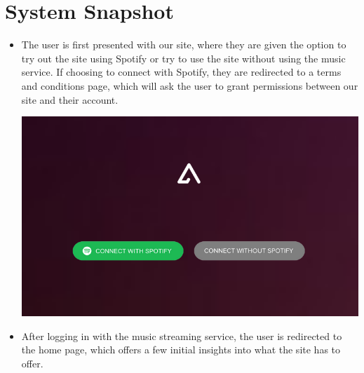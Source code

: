 \documentclass[letter, 11pt]{article}
\begin{document}
\section*{System Snapshot}
\begin{itemize}
    \item The user is first presented with our site, where they are given the option to try out the site using Spotify or try to use the site without using the music service. If choosing to connect with Spotify, they are redirected to a terms and conditions page, which will ask the user to grant permissions between our site and their account.
    
    \includegraphics[scale=0.45,left]{snapshot/Capture.PNG}
    
    \item After logging in with the music streaming service, the user is redirected to the home page, which offers a few initial insights into what the site has to offer.
    

\end{itemize}
\end{document}
